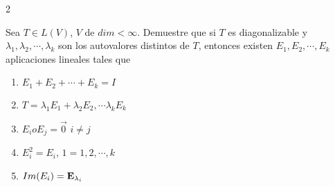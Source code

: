 2 








\begin{exercise} 
\item
Sea $T\in L(V)$, $V$ de $dim<\infty$. Demuestre que si $T$ es diagonalizable y  $\lambda_1,\lambda_2, \cdots,\lambda_k$ son  los autovalores distintos de $T$,  entonces existen  $E_1,E_2, \cdots,E_k$ aplicaciones lineales tales que 

\begin{enumerate}

\bigskip

\item   $E_1+E_2+ \cdots+E_k=I$ 

\bigskip

\item $T=\lambda_1E_1+\lambda_2E_2, \cdots\lambda_kE_k$ 

\bigskip

\item $E_i oE_j=\vec{0}$ $i\neq j$

\bigskip

\item $E_i ^2=E_i$, $1=1,2,\cdots,k$

\bigskip

\item $Im(E_i) =\bold E_{\lambda_i}$

\end{enumerate}

\end{exercise} 